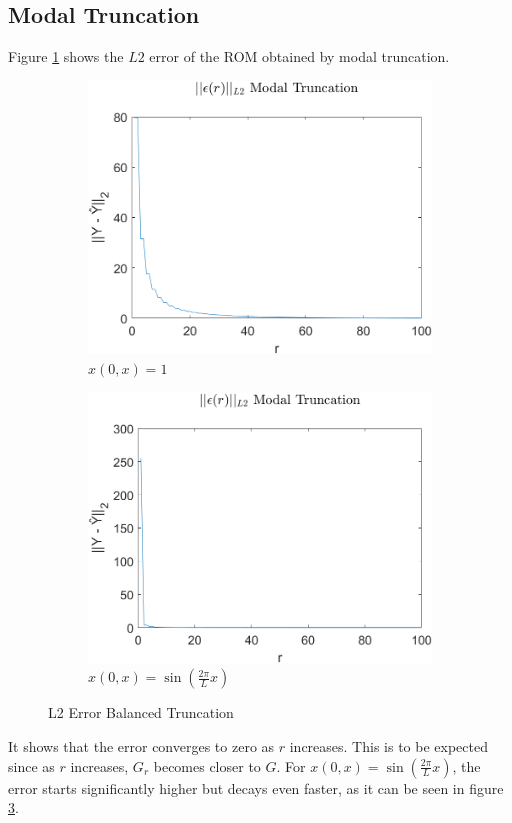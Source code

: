 \subsection{Modal Truncation}
Figure \ref{FIG-ERR-MT} shows the \(L2\) error of the ROM obtained by modal truncation.
\begin{figure}[H]
\begin{subfigure}[b]{0.5\textwidth}
\centering
\includegraphics[width=\textwidth]{images/L2_MT}
\caption{$x(0, x) = 1$}
\label{FIG-ERR-MT}
\end{subfigure}
\begin{subfigure}[b]{0.5\textwidth}
\centering
\includegraphics[width=\textwidth]{images/L2_MT_SIN}
\caption{$x(0, x) = \sin(\frac{2\pi}{L}x)$}
\label{FIG-ERR-MT-SIN}
\end{subfigure}
\caption{L2 Error Balanced Truncation}
\end{figure}
It shows that the error converges to zero as \(r\) increases.
This is to be expected since as \(r\) increases, \(G_r\) becomes closer to \(G\).
For \(x(0, x) = \sin(\frac{2\pi}{L}x)\), the error starts significantly higher but decays even faster, as it can be seen in figure \ref{FIG-ERR-MT-SIN}.
\newpage
